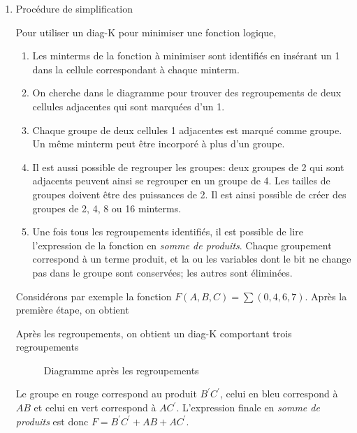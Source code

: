\documentclass[letter, oneside]{book}
\begin{document}
\begin{enumerate}
\item Procédure de simplification
\label{sec:org0fe6d66}

Pour utiliser un diag-K pour minimiser une fonction logique, 

\begin{enumerate}
\item Les minterms de la fonction à minimiser sont identifiés en insérant
un 1 dans la cellule correspondant à chaque minterm.
\item On cherche dans le diagramme pour trouver des regroupements de deux
cellules adjacentes qui sont marquées d'un 1.
\item Chaque groupe de deux cellules 1 adjacentes est marqué comme
groupe. Un même minterm peut être incorporé à plus d'un groupe.
\item Il est aussi possible de regrouper les groupes: deux groupes de 2
qui sont adjacents peuvent ainsi se regrouper en un groupe
de 4. Les tailles de groupes doivent être des puissances de 2. Il
est ainsi possible de créer des groupes de 2, 4, 8 ou 16 minterms.
\item Une fois tous les regroupements identifiés, il est possible de lire
l'expression de la fonction en \emph{somme de produits}. Chaque groupement
correspond à un terme produit, et la ou les variables dont le bit ne
change pas dans le groupe sont conservées; les autres sont
éliminées.
\end{enumerate}

Considérons par exemple la fonction \(F(A,B,C) = \sum (0, 4, 6,
7)\). Après la première étape, on obtient

\begin{center}

\label{org2cb79ec}
\end{center}

Après les regroupements, on obtient un diag-K comportant trois regroupements

\begin{figure}[htbp]
\centering

\caption{\label{fig:org64e1593}Diagramme après les regroupements}
\end{figure}

Le groupe en rouge correspond au produit \(B^\prime C^\prime\), celui
en bleu correspond à \(A B\) et celui en vert correspond à \(A
C^\prime\). L'expression finale en \emph{somme de produits} est donc \(F =
B^\prime C^\prime + A B + A C^\prime\).


\end{enumerate}
\end{document}
